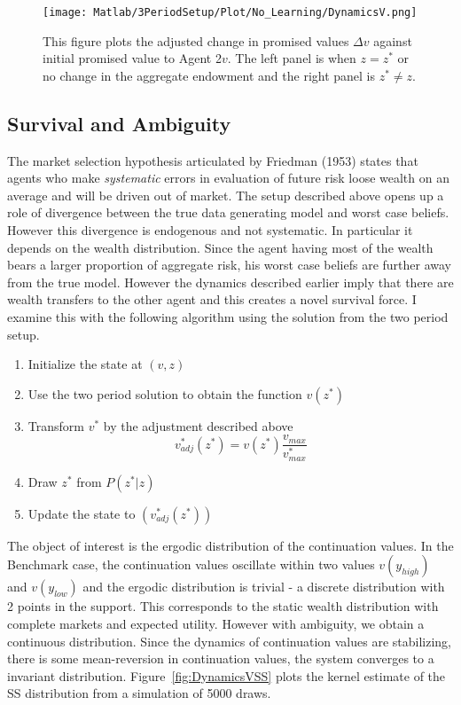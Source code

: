 \documentclass[12pt]{article}
\begin{document}
\begin{figure}[htbp]
\centering
	  \texttt{[image: Matlab/3PeriodSetup/Plot/No\_Learning/DynamicsV.png]}

	\caption{This figure plots the adjusted change in promised values $\Delta v$ against initial promised value to Agent 2$v$.  The left panel is when $z=z^*$ or no change in the aggregate endowment and the right panel is $z^*\neq z$.}
	\label{fig:DynamicsV}
\end{figure} 

\subsection{Survival and Ambiguity}
The market selection hypothesis articulated by Friedman (1953) states that agents who make \emph{systematic} errors in evaluation of future risk loose wealth on an average and will be driven out of market. The setup described above opens up a role of divergence between the true data generating model and worst case beliefs. However this divergence is endogenous and not systematic. In particular it depends on the wealth distribution. Since the agent having most of the wealth bears a larger proportion of aggregate risk, his worst case beliefs are further away from the true model. However the dynamics described earlier imply that there are wealth transfers to the other agent and this creates a novel survival force. I examine this with the following algorithm using the solution from the two period setup.

\begin{enumerate}
	\item Initialize the state at $(v,z)$
	\item Use the two period solution to obtain the function $v(z^*)$
	\item Transform $v^*$ by the adjustment described above
	\[v^*_{adj}(z^*)=v(z^*)\frac{v_{max}}{v^*_{max}}\]
	\item Draw $z^*$ from $P(z^*|z)$
	\item Update the state to $(v^*_{adj}(z^*))$
\end{enumerate}
The object of interest is the ergodic distribution of the continuation values. In the Benchmark case, the continuation values oscillate within two values $v(y_{high})$ and $v(y_{low})$ and the ergodic distribution is trivial  - a discrete distribution with 2 points in the support. This corresponds to the static wealth distribution with complete markets and expected utility. 
However with ambiguity, we obtain a continuous distribution. Since the dynamics of continuation values are stabilizing, there is some mean-reversion in continuation values, the system converges to a invariant distribution.  Figure~\ref{fig:DynamicsVSS} plots the kernel estimate of the SS distribution from a simulation of 5000 draws.
\end{document}
